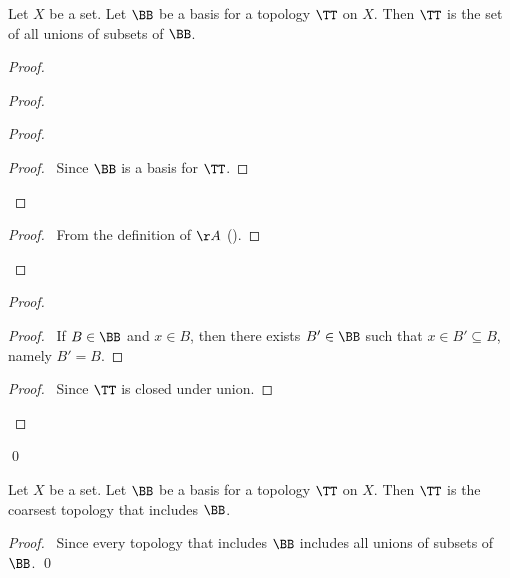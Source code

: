 \begin{lemma}
    \label{lemma:basis_unions}
    Let $X$ be a set. Let $\BB$ be a basis for a topology $\TT$ on $X$. Then $\TT$ is the set of all unions of 
    subsets of $\BB$.
\end{lemma}

\begin{proof}
    \pf
    \begin{proof}
        \begin{proof}
            \begin{proof}
                \pf\ Since $\BB$ is a basis for $\TT$.
            \end{proof}
        \end{proof}
        \begin{proof}
            \pf\ From the definition of $\AA$ ().
        \end{proof}
    \end{proof}
    \begin{proof}
        \begin{proof}
            \pf\ If $B \in \BB$ and $x \in B$, then there exists $B' \in \BB$ such that $x \in B' \subseteq B$, namely $B' = B$.
        \end{proof}
        \qedstep
        \begin{proof}
            \pf\ Since $\TT$ is closed under union.
        \end{proof}
    \end{proof}
    \qed
\end{proof}

\begin{corollary}
    \label{cor:basis_open}
    Let $X$ be a set. Let $\BB$ be a basis for a topology $\TT$ on $X$. Then $\TT$ is the coarsest topology
    that includes $\BB$.
\end{corollary}

\begin{proof}
    \pf\ Since every topology that includes $\BB$ includes all unions of subsets of $\BB$. \qed
\end{proof}

